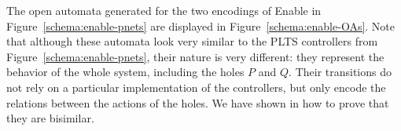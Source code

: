 \documentclass[smallcondensed]{svjour3}
\newcommand{\TODO}[1]{\textcolor{red}{\textbf{[TODO:#1]}}}
\begin{document}
The open automata generated for the two encodings of Enable in
Figure~\ref{schema:enable-pnets} are displayed in
Figure~\ref{schema:enable-OAs}.
Note that although these automata look very similar to the PLTS
controllers from Figure~\ref{schema:enable-pnets}, their nature is very
different: they represent the behavior of the whole system, including
the holes $P$ and $Q$. Their transitions do not rely on a particular
implementation of the controllers, but only encode the 
relations between the actions of the holes.
We have shown in \cite{henrio:Forte2016} how to prove that they are bisimilar.
 
\end{document}
